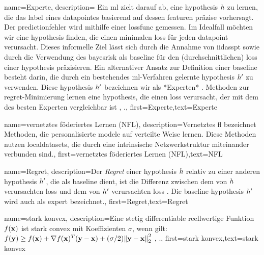 {{{{
{name={Experte},
	description={ Ein \gls{ml} zielt darauf ab, eine \gls{hypothesis} $h$ zu 			 lernen, die das \gls{label} eines \gls{datapointes} basierend auf dessen \gls{feature}n präzise vorhersagt. 
		Der \gls{prediction}fehler wird mithilfe einer \gls{lossfunc} gemessen. 
		Im Idealfall möchten wir eine \gls{hypothesis} finden, die einen minimalen \gls{loss} 
		für jeden \gls{datapoint} verursacht. Dieses informelle Ziel lässt sich durch die Annahme 
		von \gls{iidasspt} sowie durch die Verwendung des \gls{bayesrisk} als \gls{baseline} für den (durchschnittlichen) 
		\gls{loss} einer \gls{hypothesis} präzisieren. Ein alternativer Ansatz zur Definition einer \gls{baseline} 
		besteht darin, die durch ein bestehendes \gls{ml}-Verfahren gelernte \gls{hypothesis} $h'$ zu verwenden. 
		Diese \gls{hypothesis} $h'$ bezeichnen wir als *Experten* \cite{PredictionLearningGames}. 
		Methoden zur \gls{regret}-Minimierung lernen eine \gls{hypothesis}, 
		die einen \gls{loss} verursacht, der mit dem des besten Experten vergleichbar ist 
		\cite{PredictionLearningGames}, \cite{HazanOCO}.},
	first={Experte},text={Experte} 
}

{name={vernetztes föderiertes Lernen (NFL)},
	description={Vernetztes \gls{fl} bezeichnet Methoden, 
		die personalisierte \gls{model}e auf verteilte Weise lernen. 
		Diese Methoden nutzen \gls{localdataset}s, die durch eine intrinsische Netzwerkstruktur miteinander verbunden sind.},
	first={vernetztes föderiertes Lernen (NFL)},text={NFL}
}

{name={Regret},
	description={Der \textit{Regret} einer \gls{hypothesis} $h$ relativ zu 
		einer anderen \gls{hypothesis} $h'$, die als \gls{baseline} dient, 
		ist die Differenz zwischen dem von $h$ verursachten \gls{loss} 
		und dem von $h'$ verursachten \gls{loss} \cite{PredictionLearningGames}. 
		Die \gls{baseline}-\gls{hypothesis} $h'$ wird auch als \gls{expert} bezeichnet.},
	first={Regret},text={Regret}
	
	{name={stark konvex},
		description={Eine stetig \gls{differentiable} reellwertige Funktion $f({\bf x})$ ist 
			stark \gls{convex} mit Koeffizienten $\sigma$, wenn gilt: 
			$f(\vy) \geq f(\vx) + \nabla f(\vx)^{T} (\vy - \vx) + (\sigma/2) \normgeneric{\vy - \vx}{2}^{2}$ 
			\cite{nesterov04}, \cite[Abschnitt B.1.1]{CvxAlgBertsekas}.},
		first={stark konvex},text={stark konvex} 
	}
	
}}}}}

